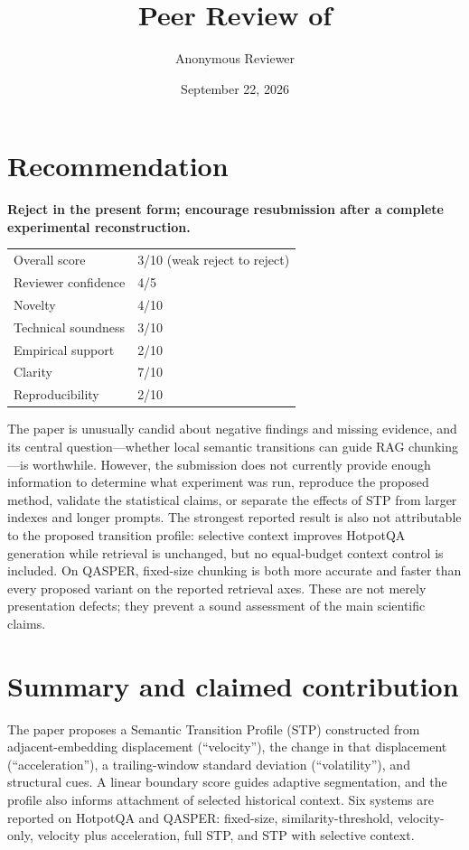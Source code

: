 \documentclass[11pt]{article}
\title{Peer Review of \paper}
\author{Anonymous Reviewer}
\date{September 22, 2026}
\begin{document}
\maketitle

\section*{Recommendation}

\textbf{Reject in the present form; encourage resubmission after a complete experimental reconstruction.}

\begin{tabularx}{\textwidth}{@{}lX@{}}
\toprule
Overall score & 3/10 (weak reject to reject) \\
Reviewer confidence & 4/5 \\
Novelty & 4/10 \\
Technical soundness & 3/10 \\
Empirical support & 2/10 \\
Clarity & 7/10 \\
Reproducibility & 2/10 \\
\bottomrule
\end{tabularx}

The paper is unusually candid about negative findings and missing evidence, and its central question---whether local semantic transitions can guide RAG chunking---is worthwhile. However, the submission does not currently provide enough information to determine what experiment was run, reproduce the proposed method, validate the statistical claims, or separate the effects of STP from larger indexes and longer prompts. The strongest reported result is also not attributable to the proposed transition profile: selective context improves HotpotQA generation while retrieval is unchanged, but no equal-budget context control is included. On QASPER, fixed-size chunking is both more accurate and faster than every proposed variant on the reported retrieval axes. These are not merely presentation defects; they prevent a sound assessment of the main scientific claims.

\section*{Summary and claimed contribution}

The paper proposes a Semantic Transition Profile (STP) constructed from adjacent-embedding displacement (``velocity''), the change in that displacement (``acceleration''), a trailing-window standard deviation (``volatility''), and structural cues. A linear boundary score guides adaptive segmentation, and the profile also informs attachment of selected historical context. Six systems are reported on HotpotQA and QASPER: fixed-size, similarity-threshold, velocity-only, velocity plus acceleration, full STP, and STP with selective context.
\end{document}
